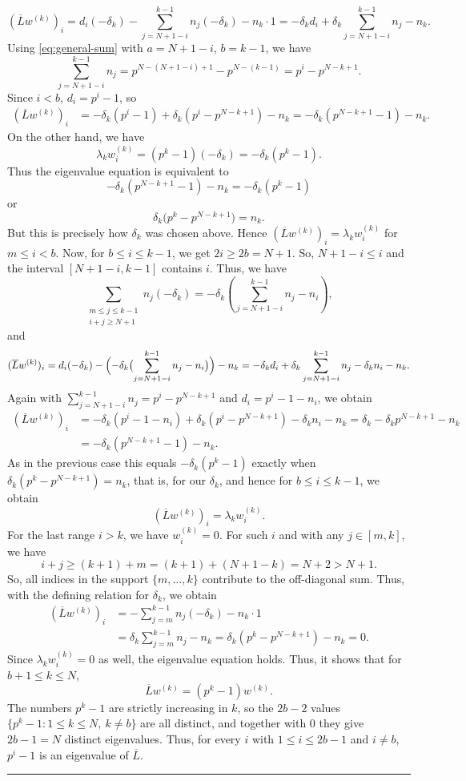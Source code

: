 \documentclass[12pt,twoside]{article}
\renewenvironment{proof}{{\noindent\bfseries Proof.}}{\qed}
\def\qed{\nolinebreak\hfill\rule{.2cm}{.2cm}\par\addvspace{.5cm}}
\begin{document}
\begin{proof}
	\[
	(\overline{L}w^{(k)})_i
	= d_i(-\delta_k) - \sum_{j=N+1-i}^{k-1} n_j(-\delta_k) - n_k\cdot 1
	= -\delta_k d_i + \delta_k\sum_{j=N+1-i}^{k-1} n_j - n_k.
	\]
	Using \eqref{eq:general-sum} with $a=N+1-i$, $b=k-1$, we have
	\[
	\sum_{j=N+1-i}^{k-1} n_j
	= p^{N-(N+1-i)+1}-p^{N-(k-1)}
	= p^{i}-p^{N-k+1}.
	\]
	Since $i<b$, $d_i=p^i-1$, so
	\begin{align*}
		(\overline{L}w^{(k)})_i
		&= -\delta_k(p^i-1) + \delta_k(p^i-p^{N-k+1}) - n_k= -\delta_k(p^{N-k+1}-1) - n_k.
	\end{align*}
	On the other hand, we have
	\[
	\lambda_k w^{(k)}_i = (p^k-1)(-\delta_k) = -\delta_k(p^k-1).
	\]
	Thus the eigenvalue equation is equivalent to
	\[
	-\delta_k(p^{N-k+1}-1) - n_k = -\delta_k(p^k-1)
	\]
	or
	\[
	\delta_k\bigl(p^k-p^{N-k+1}\bigr) = n_k.
	\]
	But this is precisely how $\delta_k$ was chosen above. Hence
	$(\overline{L}w^{(k)})_i=\lambda_k w^{(k)}_i$ for $m\le i<b$. Now, for $b\le i\le k-1$, we get $2i\ge 2b=N+1$. So, $N+1-i\le i$ and the interval
	$[N+1-i,k-1]$ contains $i$. Thus, we have
	\[
	\sum_{\substack{m\le j\le k-1\\ i+j\ge N+1}} n_j(-\delta_k)
	= -\delta_k\left(\sum_{j=N+1-i}^{k-1} n_j - n_i\right),
	\]
	and
	\[
	(\overline{L}w^{(k)})_i
	= d_i(-\delta_k) -\Bigl(-\delta_k\bigl(\sum_{j=N+1-i}^{k-1} n_j - n_i\bigr)\Bigr)
	- n_k
	= -\delta_k d_i + \delta_k\sum_{j=N+1-i}^{k-1}n_j - \delta_k n_i - n_k.
	\]
	Again with $\sum_{j=N+1-i}^{k-1}n_j=p^i-p^{N-k+1}$ and
	$d_i=p^i-1-n_i$, we obtain
	\begin{align*}
		(\overline{L}w^{(k)})_i
		&= -\delta_k(p^i-1-n_i) + \delta_k(p^i-p^{N-k+1}) - \delta_k n_i - n_k= \delta_k - \delta_k p^{N-k+1} - n_k\\
		&= -\delta_k(p^{N-k+1}-1) - n_k.
	\end{align*}
	As in the previous case this equals $-\delta_k(p^k-1)$ exactly when
	$\delta_k(p^k-p^{N-k+1})=n_k$, that is, for our $\delta_k$, and hence for $b\le i\le k-1$, we obtain
	\[
	(\overline{L}w^{(k)})_i = \lambda_k w^{(k)}_i.
	\]
	For the last range $i>k$, we have $w^{(k)}_i=0$. For such $i$ and with any $j\in[m,k]$, we have
	\[
	i+j \ge (k+1)+m = (k+1)+(N+1-k)=N+2>N+1.
	\]
	So, all indices in the support $\{m,\dots,k\}$ contribute to the off-diagonal sum. Thus, with the defining relation for $\delta_k$, we obtain
	\begin{align*}
		(\overline{L}w^{(k)})_i
		&= -\sum_{j=m}^{k-1} n_j(-\delta_k) - n_k\cdot1\\
		&= \delta_k\sum_{j=m}^{k-1}n_j - n_k
		= \delta_k(p^k-p^{N-k+1}) - n_k
		= 0.
	\end{align*}
	Since $\lambda_k w^{(k)}_i=0$
	as well, the eigenvalue equation holds. Thus,  it shows that for $b+1\le k\le N$,
	\[
	\overline{L}w^{(k)} = (p^k-1)w^{(k)}.
	\]
	The numbers $p^k-1$ are strictly increasing in $k$, so the
	$2b-2$ values $\{p^k-1:1\le k\le N,\ k\ne b\}$ are all distinct, and
	together with $0$ they give $2b-1=N$ distinct eigenvalues. Thus, for every $i$ with $1\le i\le 2b-1$ and $i\neq b$,
	$p^i-1$ is an eigenvalue of $\overline{L}$.
\end{proof}
\end{document}
